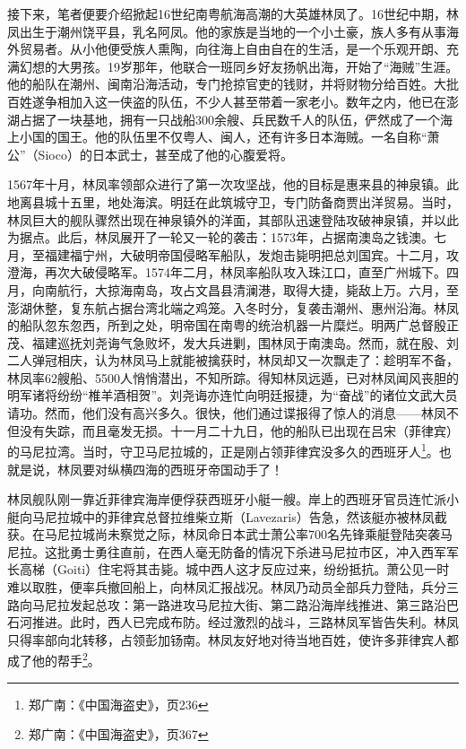 接下来，笔者便要介绍掀起16世纪南粤航海高潮的大英雄林凤了。16世纪中期，林凤出生于潮州饶平县，乳名阿凤。他的家族是当地的一个小土豪，族人多有从事海外贸易者。从小他便受族人熏陶，向往海上自由自在的生活，是一个乐观开朗、充满幻想的大男孩。19岁那年，他联合一班同乡好友扬帆出海，开始了“海贼”生涯。他的船队在潮州、闽南沿海活动，专门抢掠官吏的钱财，并将财物分给百姓。大批百姓遂争相加入这一侠盗的队伍，不少人甚至带着一家老小。数年之内，他已在澎湖占据了一块基地，拥有一只战船300余艘、兵民数千人的队伍，俨然成了一个海上小国的国王。他的队伍里不仅粤人、闽人，还有许多日本海贼。一名自称“萧公”（Sioco）的日本武士，甚至成了他的心腹爱将。

1567年十月，林凤率领部众进行了第一次攻坚战，他的目标是惠来县的神泉镇。此地离县城十五里，地处海滨。明廷在此筑城守卫，专门防备商贾出洋贸易。当时，林凤巨大的舰队骤然出现在神泉镇外的洋面，其部队迅速登陆攻破神泉镇，并以此为据点。此后，林凤展开了一轮又一轮的袭击：1573年，占据南澳岛之钱澳。七月，至福建福宁州，大破明帝国侵略军船队，发炮击毙明把总刘国宾。十二月，攻澄海，再次大破侵略军。1574年二月，林凤率船队攻入珠江口，直至广州城下。四月，向南航行，大掠海南岛，攻占文昌县清澜港，取得大捷，毙敌上万。六月，至澎湖休整，复东航占据台湾北端之鸡笼。入冬时分，复袭击潮州、惠州沿海。林凤的船队忽东忽西，所到之处，明帝国在南粤的统治机器一片糜烂。明两广总督殷正茂、福建巡抚刘尧诲气急败坏，发大兵进剿，围林凤于南澳岛。然而，就在殷、刘二人弹冠相庆，认为林凤马上就能被擒获时，林凤却又一次飘走了：趁明军不备，林凤率62艘船、5500人悄悄潜出，不知所踪。得知林凤远遁，已对林凤闻风丧胆的明军诸将纷纷“椎羊酒相贺”。刘尧诲亦连忙向明廷报捷，为“奋战”的诸位文武大员请功。然而，他们没有高兴多久。很快，他们通过谍报得了惊人的消息——林凤不但没有失踪，而且毫发无损。十一月二十九日，他的船队已出现在吕宋（菲律宾）的马尼拉湾。当时，守卫马尼拉城的，正是刚占领菲律宾没多久的西班牙人\footnote{郑广南：《中国海盗史》，页236}。也就是说，林凤要对纵横四海的西班牙帝国动手了！ 

林凤舰队刚一靠近菲律宾海岸便俘获西班牙小艇一艘。岸上的西班牙官员连忙派小艇向马尼拉城中的菲律宾总督拉维柴立斯（Lavezaris）告急，然该艇亦被林凤截获。在马尼拉城尚未察觉之际，林凤命日本武士萧公率700名先锋乘艇登陆突袭马尼拉。这批勇士勇往直前，在西人毫无防备的情况下杀进马尼拉市区，冲入西军军长高梯（Goiti）住宅将其击毙。城中西人这才反应过来，纷纷抵抗。萧公见一时难以取胜，便率兵撤回船上，向林凤汇报战况。林凤乃动员全部兵力登陆，兵分三路向马尼拉发起总攻：第一路进攻马尼拉大街、第二路沿海岸线推进、第三路沿巴石河推进。此时，西人已完成布防。经过激烈的战斗，三路林凤军皆告失利。林凤只得率部向北转移，占领彭加钖南。林凤友好地对待当地百姓，使许多菲律宾人都成了他的帮手\footnote{郑广南：《中国海盗史》，页367}。

